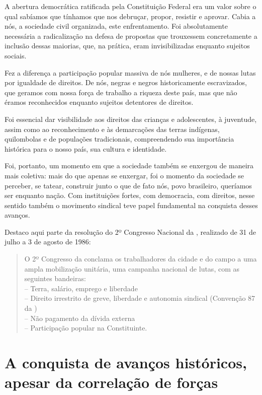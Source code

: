 A abertura democrática ratificada pela Constituição Federal era um valor
sobre o qual sabíamos que tínhamos que nos debruçar, propor, resistir e
aprovar. Cabia a nós, a sociedade civil organizada, este enfrentamento. Foi
absolutamente necessária a radicalização na defesa de propostas que
trouxessem concretamente a inclusão dessas maiorias, que, na prática,
eram invisibilizadas enquanto sujeitos sociais.

Fez a diferença a participação popular massiva de nós mulheres, e de nossas
lutas por igualdade de direitos. De nós, negras e negros
historicamente escravizados, que geramos com nossa força de trabalho a
riqueza deste país, mas que não éramos reconhecidos enquanto sujeitos
detentores de direitos.

Foi essencial dar visibilidade aos direitos das crianças e adolescentes,
à juventude, assim como ao reconhecimento e às demarcações das terras
indígenas, quilombolas e de populações tradicionais, compreendendo sua
importância histórica para o nosso país, sua cultura e identidade.

Foi, portanto, um momento em que a sociedade também se enxergou de
maneira mais coletiva: mais do que apenas se enxergar,
foi o momento da sociedade se perceber, se tatear, construir junto o que
de fato nós, povo brasileiro, queríamos ser enquanto nação. Com
instituições fortes, com democracia, com direitos, nesse sentido também o
movimento sindical teve papel fundamental na conquista desses avanços.

Destaco aqui parte da resolução do 2º Congresso Nacional da ,
realizado de 31 de julho a 3 de agosto de 1986:

\begin{quote}
O 2º Congresso da  conclama os trabalhadores da cidade e do
campo a uma ampla mobilização unitária, uma campanha nacional de lutas,
com as seguintes bandeiras:\\
-- Terra, salário, emprego e liberdade\\
-- Direito irrestrito de greve, liberdade e autonomia sindical (Convenção
87 da )\\
-- Não pagamento da dívida externa\\
-- Participação popular na Constituinte.
\end{quote}

\section{A conquista de avanços históricos, apesar da correlação de
forças}

